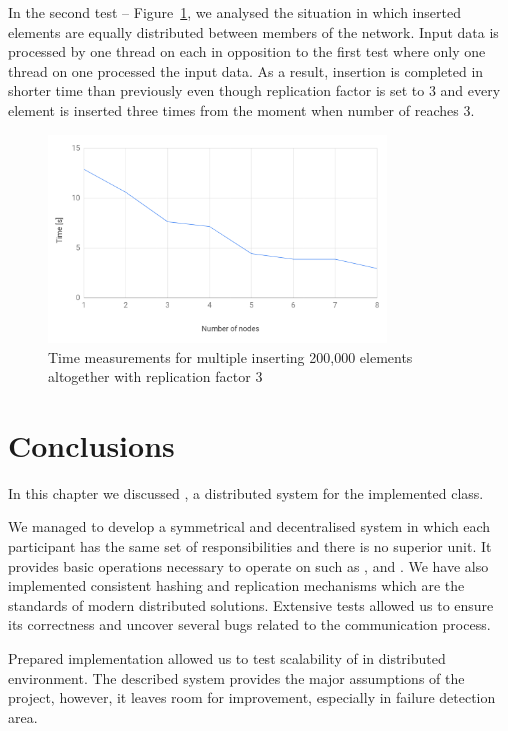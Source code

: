         In the second test -- Figure~\ref{mrf3}, we analysed the situation in which inserted elements are equally distributed between members of the network.
        Input data is processed by one thread on each \Node in opposition to the first test where only one thread on one \Node processed the input data.
        As a result, insertion is completed in shorter time than previously even though replication factor is set to 3 and every element is inserted three times from the moment when
        number of \Nodes reaches 3.
    
    \begin{figure}[H]
        \centering
        \includegraphics[width=0.8\textwidth]{thesis/figures/rf3MultipleInserts.png}
        \caption{Time measurements for multiple \Nodes inserting 200,000 elements altogether with replication factor 3}
        \label{mrf3}
    \end{figure}

\section{Conclusions}
    In this chapter we discussed \DHTS, a distributed system for the implemented \PHT class.
    
    We managed to develop a symmetrical and decentralised system in which each participant has the same set of responsibilities and there is no superior unit.
    It provides basic operations necessary to operate on \PHT such as \insertMethod, \getMethod and \removeMethod.
    We have also implemented consistent hashing and replication mechanisms which are the standards of modern distributed solutions.
    Extensive tests allowed us to ensure its correctness and uncover several bugs related to the communication process.

    Prepared \DHTS implementation allowed us to test scalability of \PHT in distributed environment. 
    The described system provides the major assumptions of the project, however, it leaves room for improvement, especially in failure detection area.